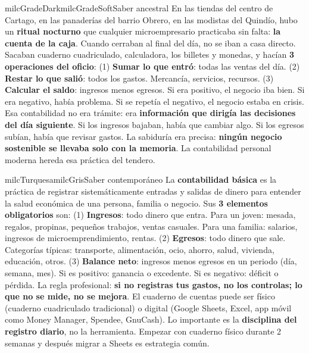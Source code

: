 \documentclass[11pt,letterpaper]{article}
\begin{document}
\begin{softbox}{milcGradeDark}{milcGradeSoft}{Saber ancestral}
En las tiendas del centro de Cartago, en las panaderías del barrio Obrero, en las modistas del Quindío, hubo un \textbf{ritual nocturno} que cualquier microempresario practicaba sin falta: \textbf{la cuenta de la caja}. Cuando cerraban al final del día, no se iban a casa directo. Sacaban cuaderno cuadriculado, calculadora, los billetes y monedas, y hacían \textbf{3 operaciones del oficio}: (1) \textbf{Sumar lo que entró}: todas las ventas del día. (2) \textbf{Restar lo que salió}: todos los gastos. Mercancía, servicios, recursos. (3) \textbf{Calcular el saldo}: ingresos menos egresos. Si era positivo, el negocio iba bien. Si era negativo, había problema. Si se repetía el negativo, el negocio estaba en crisis. Esa contabilidad no era trámite: era \textbf{información que dirigía las decisiones del día siguiente}. Si los ingresos bajaban, había que cambiar algo. Si los egresos subían, había que revisar gastos. La sabiduría era precisa: \textbf{ningún negocio sostenible se llevaba solo con la memoria}. La contabilidad personal moderna hereda esa práctica del tendero.
\end{softbox}

\begin{softbox}{milcTurquesa}{milcGris}{Saber contemporáneo}
La \textbf{contabilidad básica} es la práctica de registrar sistemáticamente entradas y salidas de dinero para entender la salud económica de una persona, familia o negocio. Sus \textbf{3 elementos obligatorios} son: (1) \textbf{Ingresos}: todo dinero que entra. Para un joven: mesada, regalos, propinas, pequeños trabajos, ventas casuales. Para una familia: salarios, ingresos de microemprendimiento, rentas. (2) \textbf{Egresos}: todo dinero que sale. Categorías típicas: transporte, alimentación, ocio, ahorro, salud, vivienda, educación, otros. (3) \textbf{Balance neto}: ingresos menos egresos en un periodo (día, semana, mes). Si es positivo: ganancia o excedente. Si es negativo: déficit o pérdida. La regla profesional: \textbf{si no registras tus gastos, no los controlas; lo que no se mide, no se mejora}. El cuaderno de cuentas puede ser físico (cuaderno cuadriculado tradicional) o digital (Google Sheets, Excel, app móvil como Money Manager, Spendee, GnuCash). Lo importante es la \textbf{disciplina del registro diario}, no la herramienta. Empezar con cuaderno físico durante 2 semanas y después migrar a Sheets es estrategia común.
\end{softbox}
\end{document}
